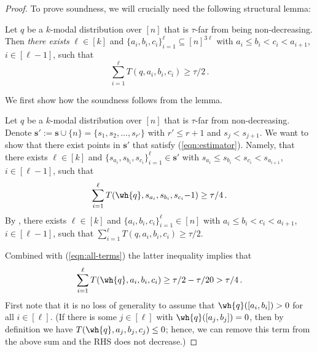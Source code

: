 \begin{proof}
%
%

%

%
%

To prove soundness, we will crucially need the following structural lemma:
\begin{lemma} \label{lem:tau-far-structure}
Let $q$ be a $k$-modal distribution over $[n]$ that is $\tau$-far from being non-decreasing. Then \emph{there exists} 
$\ell \in [k]$ and $\{a_i, b_i, c_i\}_{i=1}^{\ell} \subseteq [n]^{3\ell}$ with $a_i \le b_i < c_i < a_{i+1}$, $i \in [\ell-1]$, such that 
\begin{equation} \label{eqn:str}
\sum_{i=1}^{\ell} T(q, a_i, b_i, c_i) \ge \tau/2\,.
\end{equation}


\end{lemma}

We first show how the soundness  follows from the lemma.
{Let $q$ be a $k$-modal distribution over $[n]$ that is $\tau$-far from non-decreasing.
Denote $\mathbf{s}' := \mathbf{s} \cup \{n\} = \{s_1, s_2, \ldots, s_{r'}\}$ with $r' \le r+1$ and 
$s_j < s_{j+1}$. We want to show that there exist points in $\mathbf{s}'$ that satisfy (\ref{eqn:estimator}). Namely, that
there exists $\ell \in [k]$ and $\{ s_{a_i}, s_{b_i}, s_{c_i} \}_{i=1}^{\ell} \in \mathbf{s}'$ with $s_{a_i} \le s_{b_i} < s_{c_i} < s_{a_{i+1}}$, $i \in [\ell-1]$, 
such that
\begin{equation} \label{eqn:final-goal2}
\sum_{i=1}^{\ell} T(\wh{q}, s_{a_i}, s_{b_i}, s_{c_i}  {-1}) \ge \tau/4\,.
\end{equation}
By , there exists
$\ell \in [k]$ and $\{a_i, b_i, c_i\}_{i=1}^{\ell} \in [n]$ with $a_i \le b_i < c_i < a_{i+1}$, $i \in [\ell-1]$, 
such that $\sum_{i=1}^{\ell} T(q, a_i, b_i, c_i) \ge \tau/2$.  
 {Combined with (\ref{eqn:all-terms}) the latter {inequality} 
implies that
\begin{equation} \label{eqn:sound}
\sum_{i=1}^{\ell} T(\wh{q}, a_i, b_i, c_i) \ge \tau/2 - \tau/20 > \tau/4\,.
\end{equation} 
First note that it is no loss of generality to assume that $\wh{q}([a_i, b_i])>0$ for all $i \in [\ell]$.
(If there is some $j \in [\ell]$ with $\wh{q}([a_j, b_j])=0$, then by definition we have $T(\wh{q}, a_j, b_j, c_j) \le 0$; hence, 
we can remove this term from the above sum and the RHS does not decrease.)

}}
\end{proof}

